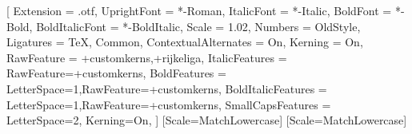 \setmainfont{Cochineal}[
  Extension = .otf,
  UprightFont = *-Roman,
  ItalicFont = *-Italic,
  BoldFont = *-Bold,
  BoldItalicFont = *-BoldItalic,
  Scale = 1.02,
  Numbers = OldStyle,
  Ligatures = {TeX, Common},
  ContextualAlternates = On,
  Kerning = On,
  RawFeature = {+customkerns,+rijkeliga},
  ItalicFeatures = {RawFeature={+customkerns}},
  BoldFeatures = {LetterSpace=1,RawFeature={+customkerns}},
  BoldItalicFeatures = {LetterSpace=1,RawFeature={+customkerns}},
  SmallCapsFeatures = {LetterSpace=2, Kerning=On},
]
\setsansfont{TeX Gyre Heros}[Scale=MatchLowercase]
\setmonofont{Inconsolatazi4}[Scale=MatchLowercase]
\linespread{1.10}

\newcommand{\VersionFontName}{Cochineal}






